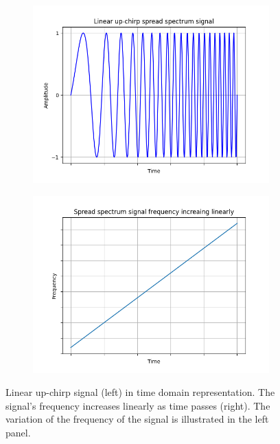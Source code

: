 \begin{figure}[H]
    \centering
    \begin{subfigure}{.49\textwidth}
      \centering
      \includegraphics[width=1.0\textwidth]{figures/Chirp Spread Spectrum Signal.png}
    \end{subfigure}
    \begin{subfigure}{.49\textwidth}
      \centering
      \includegraphics[width=1.0\textwidth]{figures/Chirp Spread Spectrum Signal Frequency.png}
    \end{subfigure}
    \caption{Linear up-chirp signal (left) in time domain representation. The signal's frequency increases linearly as time passes (right). The variation of the frequency of the signal is illustrated in the left panel.}
    \label{fig:chirp}
\end{figure}

